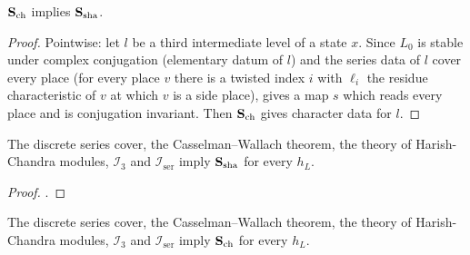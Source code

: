 \begin{lemma}\label{pf:baselat2:sck}
$\mathbf{S}_{\mathrm{ch}}$ implies $\mathbf{S}_{\mathrm{sha}}$.
\end{lemma}

\begin{proof}
Pointwise: let $l$ be a third intermediate level of a state $x$. Since $L_0$ is stable under complex
conjugation (elementary datum of $l$) and the series data of $l$ cover every place (for every place $v$ there is
a twisted index $i$ with $\ell_i$ the residue characteristic of $v$ at which $v$ is a side place),
 gives a map $s$ which reads every place
and is conjugation invariant. Then $\mathbf{S}_{\mathrm{ch}}$ gives character data for $l$.
\end{proof}

\begin{proposition}\label{pf:baselat2:sha}
The discrete series cover, the Casselman--Wallach theorem, the theory of Harish-Chandra modules,
$\mathcal{I}_3$ and $\mathcal{I}_{\mathrm{ser}}$ imply $\mathbf{S}_{\mathrm{sha}}$ for every $h_L$.
\end{proposition}

\begin{proof}
.
\end{proof}

\begin{proposition}\label{pf:baselat2:stagec}
The discrete series cover, the Casselman--Wallach theorem, the theory of Harish-Chandra modules,
$\mathcal{I}_3$ and $\mathcal{I}_{\mathrm{ser}}$ imply $\mathbf{S}_{\mathrm{ch}}$ for every $h_L$.
\end{proposition}


